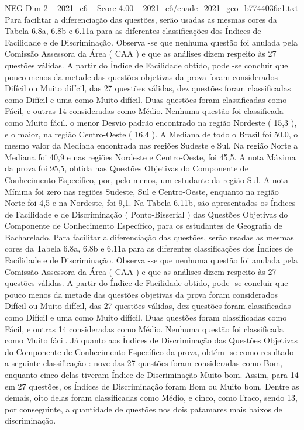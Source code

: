 \begin{textsample}{NEG Dim 2 – 2021\_c6 – Score 4.00 – 2021\_c6/enade\_2021\_geo\_b7744036e1.txt}
Para facilitar a diferenciação das questões, serão usadas as mesmas cores da Tabela 6.8a, 6.8b e 6.11a para as diferentes classificações dos Índices de Facilidade e de Discriminação.
Observa -se que nenhuma questão foi anulada pela Comissão Assessora da Área ( CAA ) e que as análises dizem respeito às 27 questões válidas.
A partir do Índice de Facilidade obtido, pode -se concluir que pouco menos da metade das questões objetivas da prova foram considerados Difícil ou Muito difícil, das 27 questões válidas, dez questões foram classificadas como Difícil e uma como Muito difícil.
Duas questões foram classificadas como Fácil, e outras 14 consideradas como Médio.
Nenhuma questão foi classificada como Muito fácil. o menor Desvio padrão encontrado na região Nordeste ( 15,3 ), e o maior, na região Centro-Oeste ( 16,4 ).
A Mediana de todo o Brasil foi 50,0, o mesmo valor da Mediana encontrada nas regiões Sudeste e Sul.
Na região Norte a Mediana foi 40,9 e nas regiões Nordeste e Centro-Oeste, foi 45,5.
A nota Máxima da prova foi 95,5, obtida nas Questões Objetivas do Componente de Conhecimento Específico, por, pelo menos, um estudante da região Sul.
A nota Mínima foi zero nas regiões Sudeste, Sul e Centro-Oeste, enquanto na região Norte foi 4,5 e na Nordeste, foi 9,1.
Na Tabela 6.11b, são apresentados os Índices de Facilidade e de Discriminação ( Ponto-Bisserial ) das Questões Objetivas do Componente de Conhecimento Específico, para os estudantes de Geografia de Bacharelado.
Para facilitar a diferenciação das questões, serão usadas as mesmas cores da Tabela 6.8a, 6.8b e 6.11a para as diferentes classificações dos Índices de Facilidade e de Discriminação.
Observa -se que nenhuma questão foi anulada pela Comissão Assessora da Área ( CAA ) e que as análises dizem respeito às 27 questões válidas.
A partir do Índice de Facilidade obtido, pode -se concluir que pouco menos da metade das questões objetivas da prova foram considerados Difícil ou Muito difícil, das 27 questões válidas, dez questões foram classificadas como Difícil e uma como Muito difícil.
Duas questões foram classificadas como Fácil, e outras 14 consideradas como Médio.
Nenhuma questão foi classificada como Muito fácil.
Já quanto aos Índices de Discriminação das Questões Objetivas do Componente de Conhecimento Específico da prova, obtém -se como resultado a seguinte classificação : nove das 27 questões foram consideradas como Bom, enquanto cinco delas tiveram Índice de Discriminação Muito bom.
Assim, para 14 em 27 questões, os Índices de Discriminação foram Bom ou Muito bom.
Dentre as demais, oito delas foram classificadas como Médio, e cinco, como Fraco, sendo 13, por conseguinte, a quantidade de questões nos dois patamares mais baixos de discriminação.

\end{textsample}
